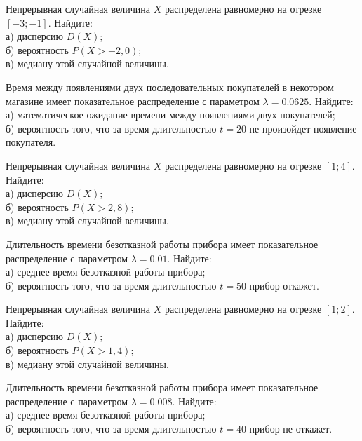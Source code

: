 \vfill

\newpage\setcounter{zad}{0}

\z Непрерывная случайная величина $X$ распределена равномерно на отрезке $[-3; -1]$. Найдите: \\ \quad а) дисперсию $D(X)$; \\ \quad б) вероятность $P(X>-2{,}0)$; \\ \quad в) медиану этой случайной величины.


\vfill

\z Время между появлениями двух последовательных покупателей в некотором магазине имеет показательное распределение с параметром $\lambda = 0.0625$. Найдите: \\ \quad а) математическое ожидание времени между появлениями двух покупателей; \\ \quad б) вероятность того, что за время длительностью $t = 20$ не произойдет появление покупателя.
 

\vfill

\newpage\setcounter{zad}{0}

\z Непрерывная случайная величина $X$ распределена равномерно на отрезке $[1; 4]$. Найдите: \\ \quad а) дисперсию $D(X)$; \\ \quad б) вероятность $P(X>2{,}8)$; \\ \quad в) медиану этой случайной величины.


\vfill

\z Длительность времени безотказной работы прибора имеет показательное распределение с параметром $\lambda = 0.01$. Найдите: \\ \quad а) среднее время безотказной работы прибора; \\ \quad б) вероятность того, что за время длительностью $t = 50$ прибор  откажет.
 

\vfill

\newpage\setcounter{zad}{0}

\z Непрерывная случайная величина $X$ распределена равномерно на отрезке $[1; 2]$. Найдите: \\ \quad а) дисперсию $D(X)$; \\ \quad б) вероятность $P(X>1{,}4)$; \\ \quad в) медиану этой случайной величины.


\vfill

\z Длительность времени безотказной работы прибора имеет показательное распределение с параметром $\lambda = 0.008$. Найдите: \\ \quad а) среднее время безотказной работы прибора; \\ \quad б) вероятность того, что за время длительностью $t = 40$ прибор не откажет.
 

